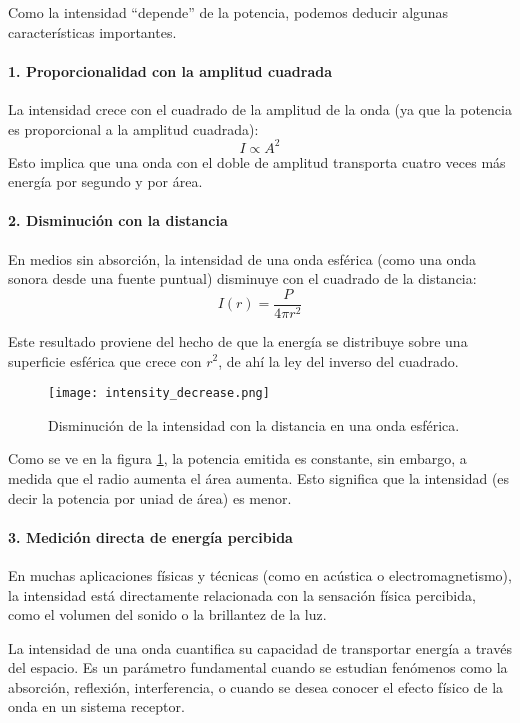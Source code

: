 Como la intensidad ``depende'' de la potencia, podemos deducir algunas características importantes. 

\paragraph{1. Proporcionalidad con la amplitud cuadrada}

La intensidad crece con el cuadrado de la amplitud de la onda (ya que la potencia es proporcional a la amplitud cuadrada):
\[
I \propto A^2
\]
Esto implica que una onda con el doble de amplitud transporta cuatro veces más energía por segundo y por área.

\paragraph{2. Disminución con la distancia}

En medios sin absorción, la intensidad de una onda esférica (como una onda sonora desde una fuente puntual) disminuye con el cuadrado de la distancia:
\[
I(r) = \frac{P}{4\pi r^2}
\]

Este resultado proviene del hecho de que la energía se distribuye sobre una superficie esférica que crece con \(r^2\), de ahí la ley del inverso del cuadrado.
\begin{figure}[ht]
  \centering
  \texttt{[image: intensity\_decrease.png]}
  \caption{Disminución de la intensidad con la distancia en una onda esférica.}
  \label{fig:intensity_decrease}
\end{figure}
Como se ve en la figura \ref{fig:intensity_decrease}, la potencia emitida es constante, sin embargo, a medida que el radio aumenta el área aumenta. Esto significa que la intensidad (es decir la potencia por uniad de área) es menor.

\paragraph{3. Medición directa de energía percibida}

En muchas aplicaciones físicas y técnicas (como en acústica o electromagnetismo), la intensidad está directamente relacionada con la sensación física percibida, como el volumen del sonido o la brillantez de la luz.

La intensidad de una onda cuantifica su capacidad de transportar energía a través del espacio. Es un parámetro fundamental cuando se estudian fenómenos como la absorción, reflexión, interferencia, o cuando se desea conocer el efecto físico de la onda en un sistema receptor.
